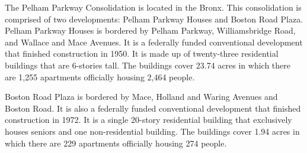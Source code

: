   

The Pelham Parkway Consolidation is located in the Bronx. This consolidation is comprised of two developments: Pelham Parkway Houses and Boston Road Plaza. Pelham Parkway Houses is bordered by Pelham Parkway, Williamsbridge Road, and Wallace and Mace Avenues. It is a federally funded conventional development that finished construction in 1950. It is made up of twenty-three residential buildings that are 6-stories tall. The buildings cover 23.74 acres in which there are 1,255 apartments officially housing 2,464 people.   

  

Boston Road Plaza is bordered by Mace, Holland and Waring Avenues and Boston Road. It is also a federally funded conventional development that finished construction in 1972. It is a single 20-story residential building that exclusively houses seniors and one non-residential building. The buildings cover 1.94 acres in which there are 229 apartments officially housing 274 people.   

 